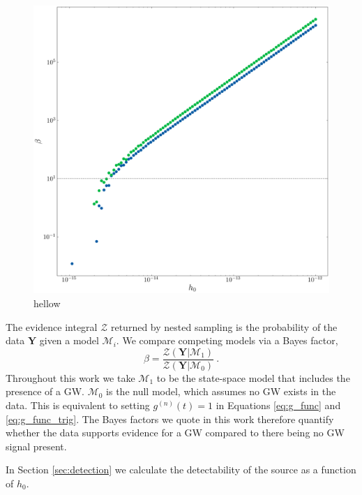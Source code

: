 \documentclass[fleqn,usenatbib,useAMS]{mnras}
\begin{document}
		\begin{figure}
			\includegraphics[width=\columnwidth, height = \columnwidth ]{images/CanonicalBayesPlot2000} 	
			\caption{hellow}
			\label{fig:bayes1}
		\end{figure}
		
		
		The evidence integral $\mathcal{Z}$ returned by nested sampling is the probability of the data $\boldsymbol{Y}$ given a model $\mathcal{M}_i$. We compare competing models via a Bayes factor,
		\begin{equation}
			\beta = \frac{\mathcal{Z}(\boldsymbol{Y} | \mathcal{M}_1)}{\mathcal{Z}(\boldsymbol{Y} | \mathcal{M}_0)} \ . \label{eq:bayes}
		\end{equation}
		Throughout this work we take $\mathcal{M}_1$ to be the state-space model that includes the presence of a GW. $\mathcal{M}_0$ is the null model, which assumes no GW exists in the data. This is equivalent to setting $g^{(n)}(t)=1$ in Equations \eqref{eq:g_func} and \eqref{eq:g_func_trig}. The Bayes factors we quote in this work therefore quantify whether the data supports evidence for a GW compared to there being no GW signal present.
		
		
		
		In Section \ref{sec:detection} we calculate the detectability of the source as a function of $h_0$. \newline
		
\end{document}
